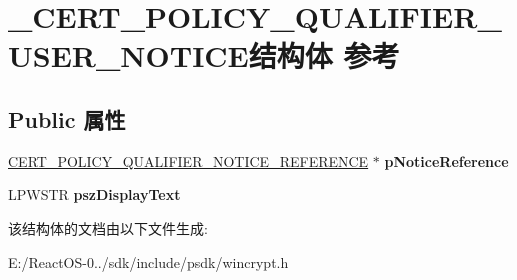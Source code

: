 \hypertarget{struct___c_e_r_t___p_o_l_i_c_y___q_u_a_l_i_f_i_e_r___u_s_e_r___n_o_t_i_c_e}{}\section{\+\_\+\+C\+E\+R\+T\+\_\+\+P\+O\+L\+I\+C\+Y\+\_\+\+Q\+U\+A\+L\+I\+F\+I\+E\+R\+\_\+\+U\+S\+E\+R\+\_\+\+N\+O\+T\+I\+C\+E结构体 参考}
\label{struct___c_e_r_t___p_o_l_i_c_y___q_u_a_l_i_f_i_e_r___u_s_e_r___n_o_t_i_c_e}
\subsection*{Public 属性}
\begin{DoxyCompactItemize}
\item 
\mbox{\label{struct___c_e_r_t___p_o_l_i_c_y___q_u_a_l_i_f_i_e_r___u_s_e_r___n_o_t_i_c_e_a766f27f65d44bed2fb6c1615832b1d89}} 
\hyperlink{struct___c_e_r_t___p_o_l_i_c_y___q_u_a_l_i_f_i_e_r___n_o_t_i_c_e___r_e_f_e_r_e_n_c_e}{C\+E\+R\+T\+\_\+\+P\+O\+L\+I\+C\+Y\+\_\+\+Q\+U\+A\+L\+I\+F\+I\+E\+R\+\_\+\+N\+O\+T\+I\+C\+E\+\_\+\+R\+E\+F\+E\+R\+E\+N\+CE} $\ast$ {\bfseries p\+Notice\+Reference}
\item 
\mbox{\label{struct___c_e_r_t___p_o_l_i_c_y___q_u_a_l_i_f_i_e_r___u_s_e_r___n_o_t_i_c_e_ac5a89fb388d9c9ba0380384d2ad59289}} 
L\+P\+W\+S\+TR {\bfseries psz\+Display\+Text}
\end{DoxyCompactItemize}


该结构体的文档由以下文件生成\+:\begin{DoxyCompactItemize}
\item 
E\+:/\+React\+O\+S-\/0../sdk/include/psdk/wincrypt.\+h\end{DoxyCompactItemize}
